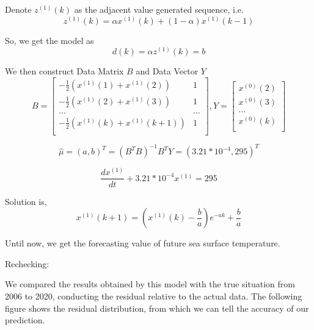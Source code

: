 \documentclass{mcmthesis}
\begin{document}
	Denote $z^{(1)}(k)$ as the adjacent value generated sequence, i.e.
\begin{equation*}
	z^{(1)}(k) = \alpha x^{(1)}(k) + (1-\alpha)x^{(1)}(k-1)
\end{equation*}\par
	So, we get the model as
\begin{equation*}
	d(k) = \alpha z^{(1)}(k) = b
\end{equation*}\par
	We then construct Data Matrix $B$ and Data Vector $Y$
\begin{equation}
	B =  \left[ \begin{matrix}
						-\frac{1}{2}(x^{(1)}(1)+x^{(1)}(2))  & 1 \\
						-\frac{1}{2}(x^{(1)}(2)+x^{(1)}(3))  & 1 \\
										...									& ... \\
						-\frac{1}{2}(x^{(1)}(k)+x^{(1)}(k+1))  & 1 \\
\end{matrix}\right],
	Y =  \left[ \begin{matrix}
						x^{(0)}(2)\\
						x^{(0)}(3)\\
							...    \\
						x^{(0)}(k)\\
\end{matrix}\right]
\end{equation}\par
\begin{equation*} 
	\hat{\mu} = (a, b)^{T} = (B^{T}B)^{-1}B^{T}Y = (3.21*10^{-4},295)^{T}
\end{equation*}\par
\begin{equation*}
	\frac{dx^{(1)}}{dt} + 3.21*10^{-4} x^{(1)} = 295
\end{equation*}\par
	Solution is, 
\begin{equation*}
	x^{(1)}(k+1) = (x^{(1)}(k) - \frac{b}{a})e^{-ak} + \frac{b}{a} 
\end{equation*}\par
	Until now, we get the forecasting value of future sea surface temperature. \par
	Rechecking: \par
	We compared the results obtained by this model with the true situation from 2006 to 2020, conducting the residual relative to the actual data. The following figure shows the residual distribution, from which we can tell the accuracy of our prediction.\par
\end{document}
